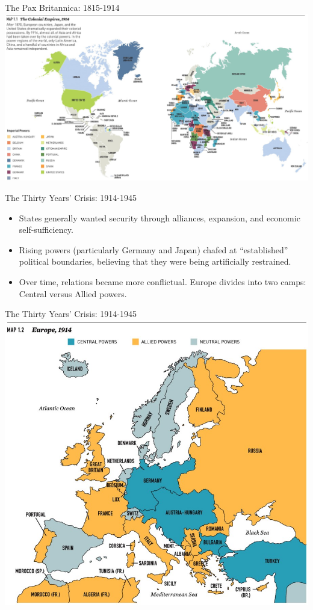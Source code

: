 \documentclass{beamer}
\begin{document}
\begin{frame}{\LARGE The Pax Britannica: 1815-1914}
	\centering
	\includegraphics[width=\textwidth,height=.9\textheight,keepaspectratio]{Colonialempires1914.jpg}	
\end{frame}

\begin{frame}{\LARGE The Thirty Years' Crisis: 1914-1945}
	\begin{itemize}
		\item States generally wanted security through alliances, expansion, and economic self-sufficiency. \pause
		\item Rising powers (particularly Germany and Japan) chafed at “established” political boundaries, believing that they were being artificially restrained. \pause
		\item Over time, relations became more conflictual.	Europe divides into two camps: Central versus Allied powers.		
	\end{itemize}
\end{frame}

\begin{frame}{\LARGE The Thirty Years' Crisis: 1914-1945}
	\centering
\includegraphics[width=\textwidth,height=.9\textheight,keepaspectratio]{CentralandAlliedpowers1914.jpg}
\end{frame}
\end{document}
